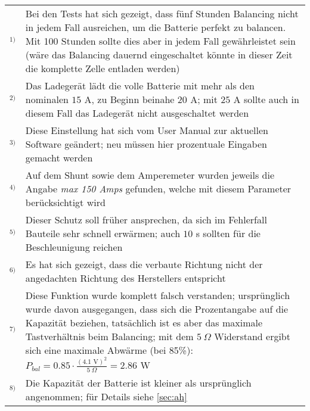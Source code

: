 \color{blue}
\begin{tabular}{p{1cm}p{15cm}}
$^{1)}$ & Bei den Tests hat sich gezeigt, dass fünf Stunden Balancing nicht in jedem Fall ausreichen, um die Batterie perfekt zu balancen. Mit 100 Stunden sollte dies aber in jedem Fall gewährleistet sein (wäre das Balancing dauernd eingeschaltet könnte in dieser Zeit die komplette Zelle entladen werden)\\[6pt]

$^{2)}$ & Das Ladegerät lädt die volle Batterie mit mehr als den nominalen $15$ A, zu Beginn beinahe $20$ A; mit $25$ A sollte auch in diesem Fall das Ladegerät nicht ausgeschaltet werden\\[6pt]

$^{3)}$ & Diese Einstellung hat sich vom User Manual zur aktuellen Software geändert; neu müssen hier prozentuale Eingaben gemacht werden\\[6pt]

$^{4)}$ & Auf dem Shunt sowie dem Amperemeter wurden jeweils die Angabe \textit{max 150 Amps} gefunden, welche mit diesem Parameter berücksichtigt wird\\[6pt]

$^{5)}$ & Dieser Schutz soll früher ansprechen, da sich im Fehlerfall Bauteile sehr schnell erwärmen; auch $10$ s sollten für die Beschleunigung reichen\\[6pt]

$^{6)}$ & Es hat sich gezeigt, dass die verbaute Richtung nicht der angedachten Richtung des Herstellers entspricht\\[6pt]

$^{7)}$ & Diese Funktion wurde komplett falsch verstanden; ursprünglich wurde davon ausgegangen, dass sich die Prozentangabe auf die Kapazität beziehen, tatsächlich ist es aber das maximale Tastverhältnis beim Balancing; mit dem $5\ \Omega$ Widerstand ergibt sich eine maximale Abwärme (bei 85\%): $P_{bal}=0.85\cdot\frac{\left(4.1\text{ V}\right)^2}{5\ \Omega}=2.86$ W\\[6pt]

$^{8)}$ & Die Kapazität der Batterie ist kleiner als ursprünglich angenommen; für Details siehe \ref{sec:ah}
\end{tabular}
\color{black}